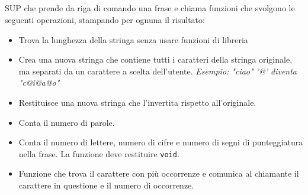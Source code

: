 \documentclass{article}
\begin{document}
\subsection{}
SUP che prende da riga di comando una frase e chiama funzioni che svolgono le seguenti operazioni, stampando per ognuna il risultato:
\begin{itemize}
	\item Trova la lunghezza della stringa senza usare funzioni di libreria
	\item Crea una nuova stringa che contiene tutti i caratteri della stringa originale, ma separati da un carattere a scelta dell'utente. \textit{Esempio: "ciao" '@' diventa "c@i@a@o"}
	\item Restituisce una nuova stringa che l'invertita rispetto all'originale.
	\item Conta il numero di parole.
	\item Conta il numero di lettere, numero di cifre e numero di segni di punteggiatura nella frase. La funzione deve restituire \texttt{void}.
	\item Funzione che trova il carattere con più occorrenze e comunica al chiamante il carattere in questione e il numero di occorrenze. 
\end{itemize}



\end{document}
